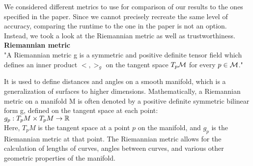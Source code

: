 





We considered different metrics to use for comparison of our results to the ones specified in the paper. Since we cannot precisely recreate the same level of accuracy, comparing the runtime to the one in the paper is not an option. Instead, we took a look at the Riemannian metric as well as trustworthiness. \\

\textbf{Riemannian metric} \\
"A Riemannian metric g is a symmetric and positive definite tensor field which defines an inner product $<,>_g$ on the tangent space $T_p\mathcal{M}$ for every $p \in \mathcal{M}$." \cite{perrauljoncas2013nonlinear}

It is used to define distances and angles on a smooth manifold, which is a generalization of surfaces to higher dimensions. Mathematically, a Riemannian metric on a manifold M is often denoted by a positive definite symmetric bilinear form g, defined on the tangent space at each point:\\

$g_p : T_pM \times T_pM \rightarrow \mathbb{R}$ \\

Here, $T_pM$ is the tangent space at a point $p$ on the manifold, and $g_p$ is the Riemannian metric at that point. 
The Riemannian metric allows for the calculation of lengths of curves, angles between curves, and various other geometric properties of the manifold. \\

